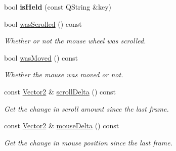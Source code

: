 \begin{Indent}
\begin{DoxyCompactItemize}
\mbox{\label{classrev_1_1_mouse_handler_a8eaf630786974ac4c74132f894c350f6}} 
bool {\bfseries is\+Held} (const Q\+String \&key)
\item 
\mbox{\label{classrev_1_1_mouse_handler_a8270ea8227098ea764fb7dd801a9d4ea}} 
bool \mbox{\hyperlink{classrev_1_1_mouse_handler_a8270ea8227098ea764fb7dd801a9d4ea}{was\+Scrolled}} () const
\begin{DoxyCompactList}\small\item\em Whether or not the mouse wheel was scrolled. \end{DoxyCompactList}\item 
\mbox{\label{classrev_1_1_mouse_handler_a5c6b3ea1dc198421b983a37e0a39a824}} 
bool \mbox{\hyperlink{classrev_1_1_mouse_handler_a5c6b3ea1dc198421b983a37e0a39a824}{was\+Moved}} () const
\begin{DoxyCompactList}\small\item\em Whether the mouse was moved or not. \end{DoxyCompactList}\item 
\mbox{\label{classrev_1_1_mouse_handler_acfe157947bcdd8403c440dfa9bea0673}} 
const \mbox{\hyperlink{classrev_1_1_vector}{Vector2}} \& \mbox{\hyperlink{classrev_1_1_mouse_handler_acfe157947bcdd8403c440dfa9bea0673}{scroll\+Delta}} () const
\begin{DoxyCompactList}\small\item\em Get the change in scroll amount since the last frame. \end{DoxyCompactList}\item 
\mbox{\label{classrev_1_1_mouse_handler_a5817537e8b67b021e1dbcda01c39ec1c}} 
const \mbox{\hyperlink{classrev_1_1_vector}{Vector2}} \& \mbox{\hyperlink{classrev_1_1_mouse_handler_a5817537e8b67b021e1dbcda01c39ec1c}{mouse\+Delta}} () const
\begin{DoxyCompactList}\small\item\em Get the change in mouse position since the last frame. \end{DoxyCompactList}\item 
\mbox{\label{classrev_1_1_mouse_handler_ad3113a63ac820d363b5e3be6e5e0ef3c}} 

\end{DoxyCompactItemize}
\end{Indent}
